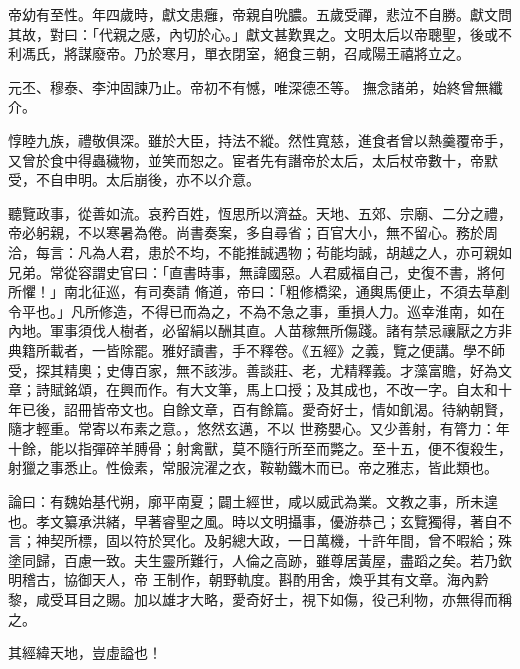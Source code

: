 \begin{pinyinscope}
 帝幼有至性。年四歲時，獻文患癰，帝親自吮膿。五歲受禪，悲泣不自勝。獻文問其故，對曰：「代親之感，內切於心。」獻文甚歎異之。文明太后以帝聰聖，後或不利馮氏，將謀廢帝。乃於寒月，單衣閉室，絕食三朝，召咸陽王禧將立之。



 元丕、穆泰、李沖固諫乃止。帝初不有憾，唯深德丕等。
 撫念諸弟，始終曾無纖介。



 惇睦九族，禮敬俱深。雖於大臣，持法不縱。然性寬慈，進食者曾以熱羹覆帝手，又曾於食中得蟲穢物，並笑而恕之。宦者先有譖帝於太后，太后杖帝數十，帝默受，不自申明。太后崩後，亦不以介意。



 聽覽政事，從善如流。哀矜百姓，恆思所以濟益。天地、五郊、宗廟、二分之禮，帝必躬親，不以寒暑為倦。尚書奏案，多自尋省；百官大小，無不留心。務於周洽，每言：凡為人君，患於不均，不能推誠遇物；茍能均誠，胡越之人，亦可親如兄弟。常從容謂史官曰：「直書時事，無諱國惡。人君威福自己，史復不書，將何所懼！」南北征巡，有司奏請
 脩道，帝曰：「粗修橋梁，通輿馬便止，不須去草剷令平也。」凡所修造，不得已而為之，不為不急之事，重損人力。巡幸淮南，如在內地。軍事須伐人樹者，必留絹以酬其直。人苗稼無所傷踐。諸有禁忌禳厭之方非典籍所載者，一皆除罷。雅好讀書，手不釋卷。《五經》之義，覽之便講。學不師受，探其精奧；史傳百家，無不該涉。善談莊、老，尤精釋義。才藻富贍，好為文章；詩賦銘頌，在興而作。有大文筆，馬上口授；及其成也，不改一字。自太和十年已後，詔冊皆帝文也。自餘文章，百有餘篇。愛奇好士，情如飢渴。待納朝賢，隨才輕重。常寄以布素之意。，悠然玄邁，不以
 世務嬰心。又少善射，有膂力：年十餘，能以指彈碎羊膊骨；射禽獸，莫不隨行所至而斃之。至十五，便不復殺生，射獵之事悉止。性儉素，常服浣濯之衣，鞍勒鐵木而已。帝之雅志，皆此類也。



 論曰：有魏始基代朔，廓平南夏；闢土經世，咸以威武為業。文教之事，所未遑也。孝文纂承洪緒，早著睿聖之風。時以文明攝事，優游恭己；玄覽獨得，著自不言；神契所標，固以符於冥化。及躬總大政，一日萬機，十許年間，曾不暇給；殊塗同歸，百慮一致。夫生靈所難行，人倫之高跡，雖尊居黃屋，盡蹈之矣。若乃欽明稽古，協御天人，帝
 王制作，朝野軌度。斟酌用舍，煥乎其有文章。海內黔黎，咸受耳目之賜。加以雄才大略，愛奇好士，視下如傷，役己利物，亦無得而稱之。



 其經緯天地，豈虛謚也！



\end{pinyinscope}
